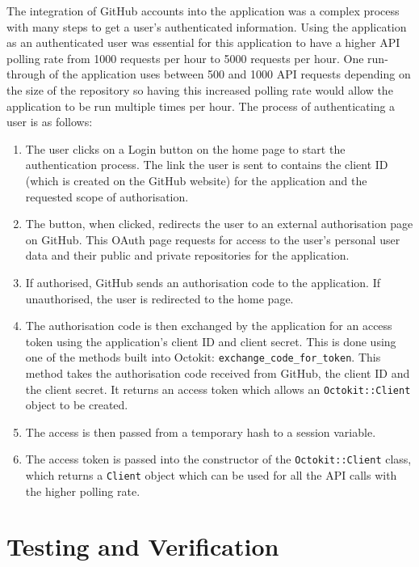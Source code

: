 The integration of GitHub accounts into the application was a complex process with many steps to get a user's authenticated information. Using the application as an authenticated user was essential for this application to have a higher API polling rate from 1000 requests per hour to 5000 requests per hour. One run-through of the application uses between 500 and 1000 API requests depending on the size of the repository so having this increased polling rate would allow the application to be run multiple times per hour. The process of authenticating a user is as follows:

\begin{enumerate}
    \item The user clicks on a Login button on the home page to start the authentication process. The link the user is sent to contains the client ID (which is created on the GitHub website) for the application and the requested scope of authorisation. 
    \item The button, when clicked, redirects the user to an external authorisation page on GitHub. This OAuth page requests for access to the user's personal user data and their public and private repositories for the application.
    \item If authorised, GitHub sends an authorisation code to the application. If unauthorised, the user is redirected to the home page.
    \item The authorisation code is then exchanged by the application for an access token using the application's client ID and client secret. This is done using one of the methods built into Octokit: \texttt{exchange\_code\_for\_token}. This method takes the authorisation code received from GitHub, the client ID and the client secret. It returns an access token which allows an \texttt{Octokit::Client} object to be created.
    \item The access is then passed from a temporary hash to a session variable. 
    \item The access token is passed into the constructor of the \texttt{Octokit::Client} class, which returns a \texttt{Client} object which can be used for all the API calls with the higher polling rate.
\end{enumerate}

\section{Testing and Verification}

